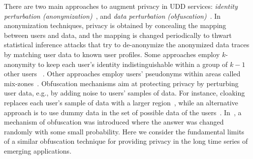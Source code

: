 There are two main approaches to augment privacy in UDD services: \emph{identity perturbation (anonymization)}~\cite{1corser2016evaluating,hoh2005protecting,freudiger2007mix, ma2009location, shokri2011quantifying2, Naini2016,soltani2017towards, soltani2018invisible}, and \emph{data perturbation (obfuscation)}~\cite{shokri2012protecting, gruteser2003anonymous, bordenabe2014optimal}. In anonymization techniques, privacy is obtained by concealing the mapping between users and data, and the mapping is changed periodically to thwart statistical inference attacks that try to de-anonymize the anonymized data traces by matching user data to known user profiles. Some approaches employ $k$-anonymity to keep each user's identity indistinguishable within a group of $k-1$ other users ~\cite{2zhang2016designing,11dewri2014exploiting, gedik2005location, zhong2009distributed, sweeney2002k, kalnis2007preventing,liu2013game}.  Other approaches employ users' pseudonyms within areas called mix-zones~\cite{beresford2003location, freudiger2009optimal, palanisamy2011mobimix}.
Obfuscation mechanisms aim at protecting privacy by perturbing user data, e.g., by adding noise to users' samples of data.   For instance, cloaking replaces each user's sample of data with a larger region~\cite{18shokri2014hiding,8zurbaran2015near,hoh2007preserving, wernke2014classification, chow2011spatial, um2010advanced}, while an alternative approach is to use dummy data in the set of possible data of the users~\cite{kido2005protection, shankar2009privately, chow2009faking, kido2005anonymous, lu2008pad}. In~\cite{randomizedresponse}, a mechanism of obfuscation was introduced where the answer was changed randomly with some small probability. Here we consider the fundamental limits of a similar obfuscation technique for providing privacy in the long time series of emerging applications.



